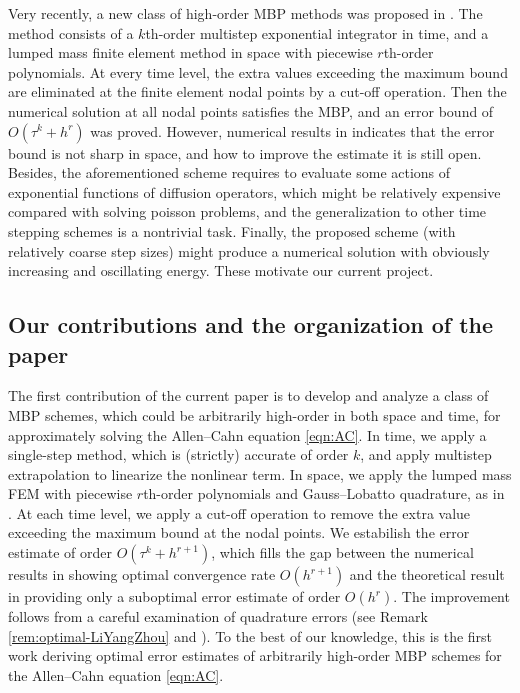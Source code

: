 \documentclass[10pt,final,leqno,onefignum,onetabnum]{siamltex}%
\begin{document}
Very recently, a new class of high-order MBP methods was proposed in \cite{LiYangZhou:sisc}.
The method consists of a $k$th-order multistep exponential integrator
in time, and a lumped mass finite element method in space with piecewise $r$th-order
polynomials. At every time level, the extra values exceeding the maximum bound
are eliminated at the finite element nodal points by a cut-off operation.
Then the numerical solution at all nodal points
satisfies the MBP, and an error bound of $O(\tau^k + h^r)$ was proved. However, numerical results in \cite[Table 4.1]{LiYangZhou:sisc}
indicates that the error bound is not sharp in space, and how to improve the estimate it is still open.
Besides, the aforementioned scheme requires to evaluate some actions of exponential functions of diffusion operators,
which might be relatively expensive compared with solving poisson problems, and the generalization to other time stepping schemes is a nontrivial task.
Finally, the proposed scheme (with relatively coarse step sizes) might produce a numerical solution with obviously
increasing and oscillating energy. These motivate our current project.

\subsection{Our contributions and the organization of the paper}
The first contribution of the current paper is to develop and analyze
a class of MBP schemes, which could be arbitrarily high-order in both space and time,
for approximately solving the Allen--Cahn equation \eqref{eqn:AC}.
In time, we apply a single-step method, which is (strictly) accurate of order $k$,
and apply multistep extrapolation to linearize the nonlinear term.
In space, we apply the lumped mass FEM with piecewise $r$th-order
polynomials and Gauss--Lobatto quadrature, as in \cite{LiYangZhou:sisc}.
At each time level, we apply a cut-off operation to remove the extra value exceeding the maximum bound
at the nodal points. We estabilish the error estimate of order $O(\tau^k + h^{r+1})$,
which fills the gap between the numerical results in \cite[Theorem 3.2]{LiYangZhou:sisc} showing optimal convergence rate $O(h^{r+1})$
and the theoretical result in \cite[Table 4.1]{LiYangZhou:sisc} providing only a suboptimal error estimate of order $O(h^{r})$.
The improvement follows from a careful examination of quadrature errors
(see Remark \ref{rem:optimal-LiYangZhou} and \cite[eq. (2.6) and (3.22)]{LiYangZhou:sisc}).
To the best of our knowledge, this is the first work deriving optimal error estimates
of  arbitrarily high-order MBP schemes for the Allen--Cahn equation  \eqref{eqn:AC}.
\end{document}
